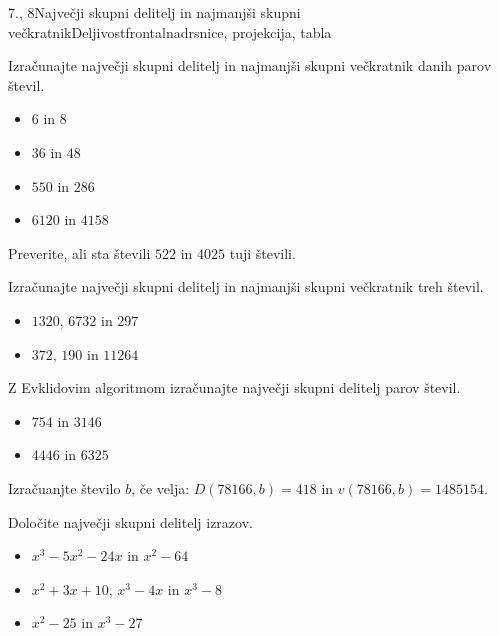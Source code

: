 \begin{priprava}{7., 8}{}{Največji skupni delitelj in najmanjši skupni večkratnik}{Deljivost}{frontalna}{drsnice, projekcija, tabla}
~\\

\begin{multicols}{2}

\begin{naloga}
    Izračunajte največji skupni delitelj in najmanjši skupni večkratnik danih parov števil.
    \begin{itemize}
        \item $6$ in $8$ 
        \item $36$ in $48$ 
        \item $550$ in $286$ 
        \item $6120$ in $4158$ 
    \end{itemize}
\end{naloga}

\begin{naloga}
    Preverite, ali sta števili $522$ in $4025$ tuji števili. 
\end{naloga}

\begin{naloga}
    Izračunajte največji skupni delitelj in najmanjši skupni večkratnik treh števil.
    \begin{itemize}
        \item $1320$, $6732$ in $297$ 
        \item $372$, $190$ in $11264$ 
    \end{itemize}
\end{naloga}

\begin{naloga}
    Z Evklidovim algoritmom izračunajte največji skupni delitelj parov števil.
    \begin{itemize}
        \item $754$ in $3146$ 
        \item $4446$ in $6325$ 
    \end{itemize}
\end{naloga}

\begin{naloga}
    Izračuanjte število $b$, če velja: $D(78 166, b)=418$ in $v(78 166, b)=1 485 154$. 
\end{naloga}

\begin{naloga}
    Določite največji skupni delitelj izrazov.
    \begin{itemize}
        \item $x^3-5x^2-24x$ in $x^2-64$ 
        \item $x^2+3x+10$, $x^3-4x$ in $x^3-8$ 
        \item $x^2-25$ in $x^3-27$ 
    \end{itemize}
\end{naloga}


\end{multicols}
\end{priprava}
